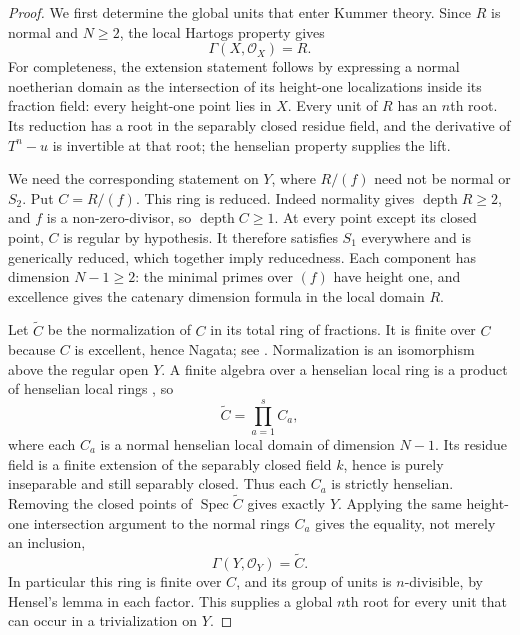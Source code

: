 \begin{proof}
We first determine the global units that enter Kummer
theory. Since $R$ is normal and $N\ge2$, the local
Hartogs property gives
\[
                  \Gamma(X,\mathcal O_X)=R.
\]
For completeness, the extension statement follows by
expressing a normal noetherian domain as the intersection
of its height-one localizations inside its fraction
field: every height-one point lies in $X$.
Every unit of $R$ has an $n$th root. Its reduction has
a root in the separably closed residue field, and
the derivative of $T^n-u$ is invertible at that root;
the henselian property supplies the lift.

We need the corresponding statement on $Y$, where
$R/(f)$ need not be normal or $S_2$. Put $C=R/(f)$.
This ring is reduced. Indeed normality gives
$\operatorname{depth}R\ge2$, and $f$ is a non-zero-divisor,
so $\operatorname{depth}C\ge1$. At every point except
its closed point, $C$ is regular by hypothesis.
It therefore satisfies $S_1$ everywhere and is
generically reduced, which together imply reducedness.
Each component has dimension $N-1\ge2$: the minimal
primes over $(f)$ have height one, and excellence
gives the catenary dimension formula in the local
domain $R$.

Let $\widetilde C$ be the normalization of $C$ in
its total ring of fractions. It is finite over $C$
because $C$ is excellent, hence Nagata; see
\citet[Lemma 29.54.14, Tag 0AVK]{D_StacksLocalPicard}.
Normalization is an isomorphism above the regular
open $Y$. A finite algebra over a henselian local
ring is a product of henselian local rings
\citep[Lemma 10.153.4, Tag 04GH]{D_StacksLocalPicard},
so
\[
                    \widetilde C=\prod_{a=1}^{s} C_a,
\]
where each $C_a$ is a normal henselian local domain
of dimension $N-1$. Its residue field is a finite
extension of the separably closed field $k$, hence
is purely inseparable and still separably closed.
Thus each $C_a$ is strictly henselian. Removing the
closed points of $\operatorname{Spec}\widetilde C$
gives exactly $Y$. Applying the same height-one
intersection argument to the normal rings $C_a$
gives the equality, not merely an inclusion,
\begin{equation}\label{eq:C3-section-finite-normalization}
             \Gamma(Y,\mathcal O_Y)=\widetilde C.
\end{equation}
In particular this ring is finite over $C$, and
its group of units is $n$-divisible, by Hensel's
lemma in each factor. This supplies a global
$n$th root for every unit that can occur in a
trivialization on $Y$.


\end{proof}
